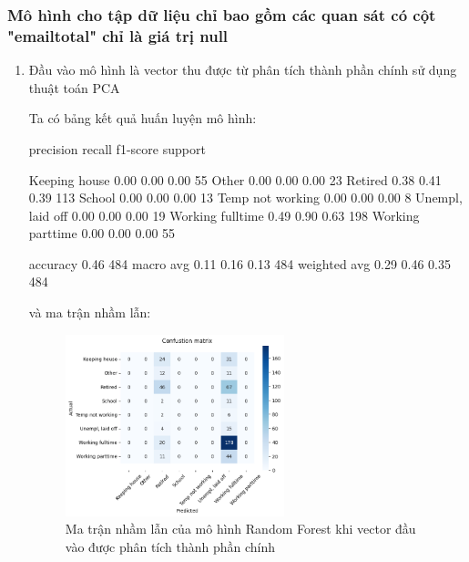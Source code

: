 \subsubsection{Mô hình cho tập dữ liệu chỉ bao gồm các quan sát có cột "emailtotal" chỉ là giá trị null}

\begin{enumerate}[label=(\alph*)]
    \item Đầu vào mô hình là vector thu được từ phân tích thành phần chính sử dụng thuật toán PCA
    
    Ta có bảng kết quả huấn luyện mô hình:

    \begin{python}
                        precision    recall  f1-score   support

        Keeping house       0.00      0.00      0.00        55
                Other       0.00      0.00      0.00        23
              Retired       0.38      0.41      0.39       113
               School       0.00      0.00      0.00        13
     Temp not working       0.00      0.00      0.00         8
     Unempl, laid off       0.00      0.00      0.00        19
     Working fulltime       0.49      0.90      0.63       198
     Working parttime       0.00      0.00      0.00        55
     
             accuracy                           0.46       484
            macro avg       0.11      0.16      0.13       484
         weighted avg       0.29      0.46      0.35       484
     
    \end{python}

    và ma trận nhầm lẫn:

    \begin{figure}[H]
        \centering
        \includegraphics[width=0.6\textwidth]{figures/Thanh/Models/Random_Forest/With_null_models_confusion_matrix_Random_Forest_PCA_features.png}
        \caption{Ma trận nhầm lẫn của mô hình Random Forest khi vector đầu vào được phân tích thành phần chính}
        \label{fig:With_null_models_confusion_matrix_Random_Forest_PCA_features}
    \end{figure}
    

\end{enumerate}
